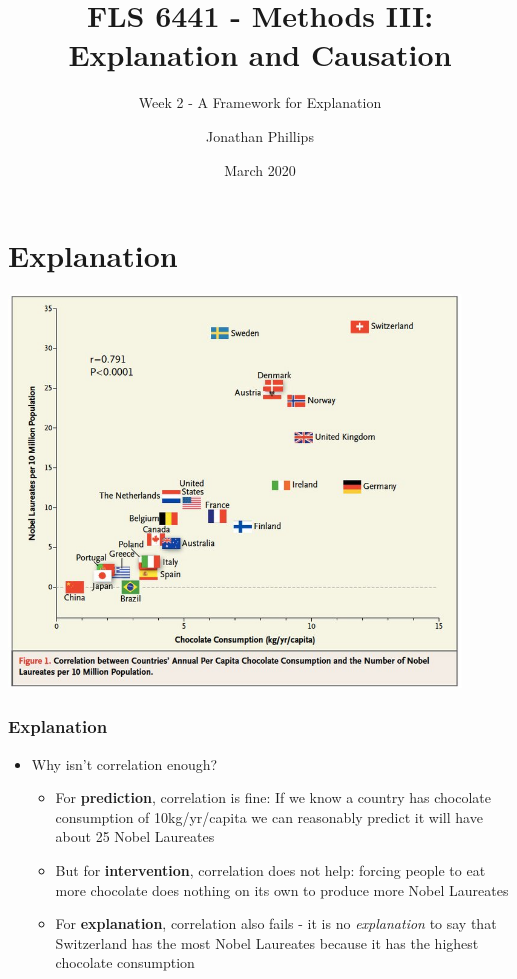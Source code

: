 \documentclass[xcolor=x11names,compress]{beamer}\usepackage[]{graphicx}\usepackage[]{color}
\title{FLS 6441 - Methods III: Explanation and Causation}
\subtitle{Week 2 - A Framework for Explanation}
\author{Jonathan Phillips}
\date{March 2020}
\renewcommand{\(}{\begin{columns}}
\renewcommand{\)}{\end{columns}}
\newcommand{\<}[1]{\begin{column}{#1}}
\renewcommand{\>}{\end{column}}
\begin{document}
\frame{\titlepage}

\section{Explanation}

\includegraphics[width=0.9\textwidth]{Chocolate_Nobel.jpg}

\begin{frame}
\frametitle{Explanation}
\small
\begin{itemize}
\item Why isn't correlation enough?
\pause
\begin{itemize}
\item For \textbf{prediction}, correlation is fine: If we know a country has chocolate consumption of 10kg/yr/capita we can reasonably predict it will have about 25 Nobel Laureates
\pause
\item But for \textbf{intervention}, correlation does not help: forcing people to eat more chocolate does nothing on its own to produce more Nobel Laureates
\pause
\item For \textbf{explanation}, correlation also fails - it is no \textit{explanation} to say that Switzerland has the most Nobel Laureates because it has the highest chocolate consumption
\end{itemize}
\end{itemize}
\normalsize
\end{frame}
\end{document}
